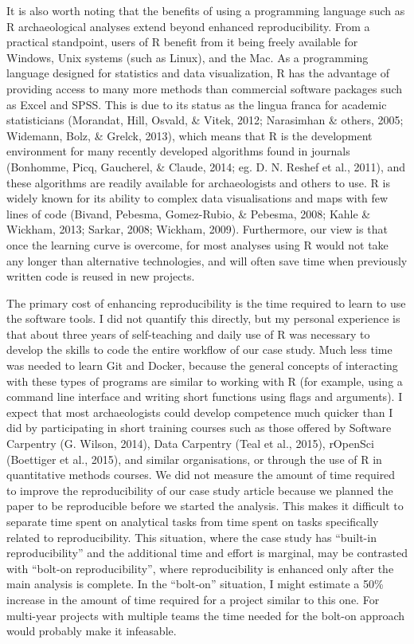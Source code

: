 \documentclass[american,man]{apa6}
\begin{document}
It is also worth noting that the benefits of using a programming
language such as R archaeological analyses extend beyond enhanced
reproducibility. From a practical standpoint, users of R benefit from it
being freely available for Windows, Unix systems (such as Linux), and
the Mac. As a programming language designed for statistics and data
visualization, R has the advantage of providing access to many more
methods than commercial software packages such as Excel and SPSS. This
is due to its status as the lingua franca for academic statisticians
(Morandat, Hill, Osvald, \& Vitek, 2012; Narasimhan \& others, 2005;
Widemann, Bolz, \& Grelck, 2013), which means that R is the development
environment for many recently developed algorithms found in journals
(Bonhomme, Picq, Gaucherel, \& Claude, 2014; eg. D. N. Reshef et al.,
2011), and these algorithms are readily available for archaeologists and
others to use. R is widely known for its ability to complex data
visualisations and maps with few lines of code (Bivand, Pebesma,
Gomez-Rubio, \& Pebesma, 2008; Kahle \& Wickham, 2013; Sarkar, 2008;
Wickham, 2009). Furthermore, our view is that once the learning curve is
overcome, for most analyses using R would not take any longer than
alternative technologies, and will often save time when previously
written code is reused in new projects.

The primary cost of enhancing reproducibility is the time required to
learn to use the software tools. I did not quantify this directly, but
my personal experience is that about three years of self-teaching and
daily use of R was necessary to develop the skills to code the entire
workflow of our case study. Much less time was needed to learn Git and
Docker, because the general concepts of interacting with these types of
programs are similar to working with R (for example, using a command
line interface and writing short functions using flags and arguments). I
expect that most archaeologists could develop competence much quicker
than I did by participating in short training courses such as those
offered by Software Carpentry (G. Wilson, 2014), Data Carpentry (Teal et
al., 2015), rOpenSci (Boettiger et al., 2015), and similar
organisations, or through the use of R in quantitative methods courses.
We did not measure the amount of time required to improve the
reproducibility of our case study article because we planned the paper
to be reproducible before we started the analysis. This makes it
difficult to separate time spent on analytical tasks from time spent on
tasks specifically related to reproducibility. This situation, where the
case study has \enquote{built-in reproducibility} and the additional
time and effort is marginal, may be contrasted with \enquote{bolt-on
reproducibility}, where reproducibility is enhanced only after the main
analysis is complete. In the \enquote{bolt-on} situation, I might
estimate a 50\% increase in the amount of time required for a project
similar to this one. For multi-year projects with multiple teams the
time needed for the bolt-on approach would probably make it infeasable.
\end{document}
